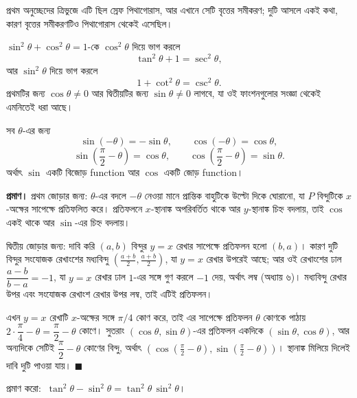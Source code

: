 \documentclass[11pt]{article}
\begin{document}
প্রথম অনুচ্ছেদের ত্রিভুজে এটি ছিল স্রেফ পিথাগোরাস, আর এখানে সেটি বৃত্তের
সমীকরণ; দুটি আসলে একই কথা, কারণ বৃত্তের সমীকরণটিও পিথাগোরাস থেকেই এসেছিল।

\begin{idea}[আরও দুটি রূপ]
$\sin^2\theta + \cos^2\theta = 1$-কে $\cos^2\theta$ দিয়ে ভাগ করলে
\[
  \tan^2\theta + 1 = \sec^2\theta ,
\]
আর $\sin^2\theta$ দিয়ে ভাগ করলে
\[
  1 + \cot^2\theta = \csc^2\theta .
\]
প্রথমটির জন্য $\cos\theta \neq 0$ আর দ্বিতীয়টির জন্য $\sin\theta \neq 0$ লাগবে,
যা ওই ফাংশনগুলোর সংজ্ঞা থেকেই এমনিতেই ধরা আছে।
\end{idea}

\begin{idea}[জোড়, বিজোড় ও পূরক কোণ]
সব $\theta$-এর জন্য
\[
  \sin(-\theta) = -\sin\theta, \qquad \cos(-\theta) = \cos\theta ,
\]
\[
  \sin\!\left( \frac{\pi}{2} - \theta \right) = \cos\theta, \qquad
  \cos\!\left( \frac{\pi}{2} - \theta \right) = \sin\theta .
\]
অর্থাৎ $\sin$ একটি বিজোড় function আর $\cos$ একটি জোড় function।
\end{idea}

\noindent
\textbf{প্রমাণ।} প্রথম জোড়ার জন্য: $\theta$-এর বদলে $-\theta$ নেওয়া মানে
প্রান্তিক বাহুটিকে উল্টো দিকে ঘোরানো, যা $P$ বিন্দুটিকে $x$-অক্ষের সাপেক্ষে
প্রতিফলিত করে। প্রতিফলনে $x$-স্থানাঙ্ক অপরিবর্তিত থাকে আর $y$-স্থানাঙ্ক চিহ্ন
বদলায়, তাই $\cos$ একই থাকে আর $\sin$-এর চিহ্ন বদলায়।

দ্বিতীয় জোড়ার জন্য: দাবি করি $(a,b)$ বিন্দুর $y = x$ রেখার সাপেক্ষে প্রতিফলন
হলো $(b,a)$। কারণ দুটি বিন্দুর সংযোজক রেখাংশের মধ্যবিন্দু
$\left( \tfrac{a+b}{2}, \tfrac{a+b}{2} \right)$, যা $y=x$ রেখার উপরেই আছে; আর
ওই রেখাংশের ঢাল $\dfrac{a-b}{b-a} = -1$, যা $y=x$ রেখার ঢাল $1$-এর সঙ্গে গুণ
করলে $-1$ দেয়, অর্থাৎ লম্ব (অধ্যায় ৬)। মধ্যবিন্দু রেখার উপর এবং সংযোজক
রেখাংশ রেখার উপর লম্ব, তাই এটিই প্রতিফলন।

এখন $y=x$ রেখাটি $x$-অক্ষের সঙ্গে $\pi/4$ কোণ করে, তাই এর সাপেক্ষে প্রতিফলন
$\theta$ কোণকে পাঠায় $2 \cdot \dfrac{\pi}{4} - \theta = \dfrac{\pi}{2} - \theta$
কোণে। সুতরাং $\left( \cos\theta, \sin\theta \right)$-এর প্রতিফলন একদিকে
$\left( \sin\theta, \cos\theta \right)$, আর অন্যদিকে সেটিই
$\dfrac{\pi}{2} - \theta$ কোণের বিন্দু, অর্থাৎ
$\left( \cos\!\left( \tfrac{\pi}{2} - \theta \right),
\sin\!\left( \tfrac{\pi}{2} - \theta \right) \right)$। স্থানাঙ্ক মিলিয়ে দিলেই
দাবি দুটি পাওয়া যায়। $\blacksquare$

\begin{example}
প্রমাণ করো: $\ \tan^2\theta - \sin^2\theta = \tan^2\theta \, \sin^2\theta$।
\end{example}
\end{document}
